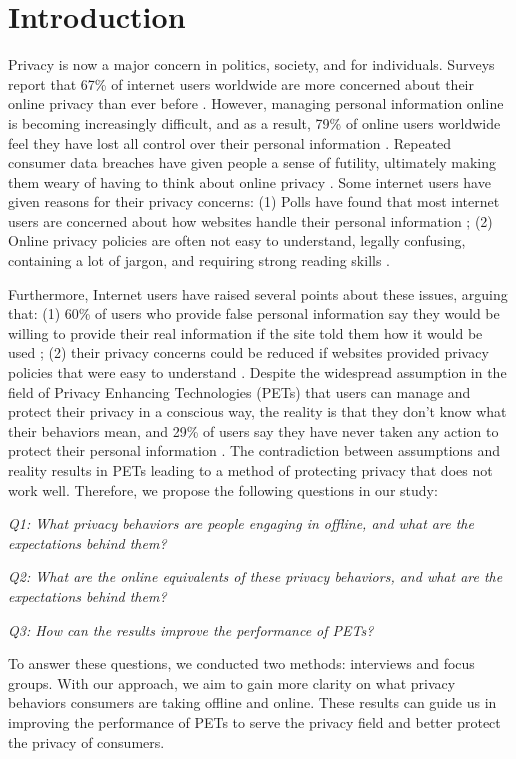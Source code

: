 \section{Introduction}
\label{sec:1}
Privacy is now a major concern in politics, society, and for individuals. Surveys report that 67\% of internet users worldwide are more concerned about their online privacy than ever before \cite{one}. However, managing personal information online is becoming increasingly difficult, and as a result, 79\% of online users worldwide feel they have lost all control over their personal information \cite{one,two}. Repeated consumer data breaches have given people a sense of futility, ultimately making them weary of having to think about online privacy \cite{two}. Some internet users have given reasons for their privacy concerns: (1) Polls have found that most internet users are concerned about how websites handle their personal information \cite{three}; (2) Online privacy policies are often not easy to understand, legally confusing, containing a lot of jargon, and requiring strong reading skills \cite{four}.

Furthermore, Internet users have raised several points about these issues, arguing that: (1) 60\% of users who provide false personal information say they would be willing to provide their real information if the site told them how it would be used \cite{five}; (2) their privacy concerns could be reduced if websites provided privacy policies that were easy to understand \cite{three}. Despite the widespread assumption in the field of Privacy Enhancing Technologies (PETs) that users can manage and protect their privacy in a conscious way, the reality is that they don't know what their behaviors mean, and 29\% of users say they have never taken any action to protect their personal information \cite{six}. The contradiction between assumptions and reality results in PETs leading to a method of protecting privacy that does not work well. Therefore, we propose the following questions in our study:

\textit{Q1: What privacy behaviors are people engaging in offline, and what are the expectations behind them?}

\textit{Q2: What are the online equivalents of these privacy behaviors, and what are the expectations behind them?}

\textit{Q3: How can the results improve the performance of PETs?}

To answer these questions, we conducted two methods: interviews and focus groups. With our approach, we aim to gain more clarity on what privacy behaviors consumers are taking offline and online. These results can guide us in improving the performance of PETs to serve the privacy field and better protect the privacy of consumers.

